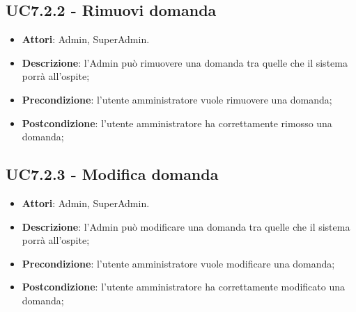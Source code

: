 \documentclass[../AnalisiDeiRequisiti.tex]{subfiles}
\begin{document}
\subsection{UC7.2.2 - Rimuovi domanda} 
\label{sssec:UC7.2.2} 
\begin{itemize} 
\item \textbf{Attori}: Admin, SuperAdmin.
\item \textbf{Descrizione}: l'Admin può rimuovere una domanda tra quelle che il sistema porrà all'ospite;
\item \textbf{Precondizione}: l'utente amministratore vuole rimuovere una domanda;
\item \textbf{Postcondizione}: l'utente amministratore ha correttamente rimosso una domanda;
\end{itemize} 
\subsection{UC7.2.3 - Modifica domanda} 
\label{sssec:UC7.2.3} 
\begin{itemize} 
\item \textbf{Attori}: Admin, SuperAdmin.
\item \textbf{Descrizione}: l'Admin può modificare una domanda tra quelle che il sistema porrà all'ospite;
\item \textbf{Precondizione}: l'utente amministratore vuole modificare una domanda;
\item \textbf{Postcondizione}: l'utente amministratore ha correttamente modificato una domanda;
\end{itemize} 
\end{document}
